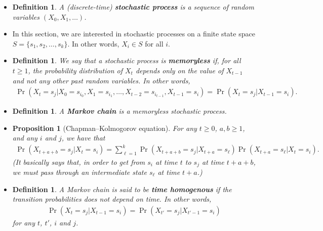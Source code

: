 \documentclass[10pt]{article}
\newtheorem{definition}[lemma]{Definition}
\newtheorem{proposition}[lemma]{Proposition}
\begin{document}
\begin{itemize}
  \item \begin{definition}
    A (discrete-time) {\bf stochastic process} is a sequence of random variables $(X_0, X_1, \dotsc)$.
  \end{definition}

  \item In this section, we are interested in stochastic processes on a finite state space $S = \{s_1, s_2, \dotsc, s_k\}$. In other words, $X_i \in S$ for all $i$.
  
  \item \begin{definition}
    We say that a stochastic process is {\bf memoryless} if, for all $t \geq 1$, the probability distribution of $X_t$ depends only on the value of $X_{t-1}$ and not any other past random variables. In other words,
    \begin{align*}
        \Pr(X_t = s_j | X_0 = s_{i_0}, X_1 = s_{i_1}, \dotsc, X_{t-2} = s_{i_{t-1}}, X_{t-1} = s_i)
        = \Pr(X_t = s_j | X_{t-1} = s_i).
    \end{align*}
  \end{definition}

  \item \begin{definition}
    A {\bf Markov chain} is a memoryless stochastic process.
  \end{definition}

  \item \begin{proposition}[Chapman--Kolmogorov equation]
    For any $t \geq 0$, $a,b \geq 1$, and any $i$ and $j$, we have that
    \begin{align*}
        \Pr(X_{t+a+b}=s_j|X_t=s_i)
        = \sum_{\ell=1}^k \Pr(X_{t+a+b}=s_j|X_{t+a}=s_\ell) \Pr(X_{t+a}=s_\ell|X_{t}=s_i).
    \end{align*}
    (It basically says that, in order to get from $s_i$ at time $t$ to $s_j$ at time $t+a+b$, we must pass through an intermediate state $s_\ell$ at time $t+a$.)
  \end{proposition}

  \item \begin{definition}
    A Markov chain is said to be {\bf time homogenous} if the transition probabilities does not depend on time. In other words,
    \begin{align*}
        \Pr(X_t = s_j | X_{t-1} = s_i) = \Pr(X_{t'} = s_j | X_{t'-1} = s_i)
    \end{align*}
    for any $t$, $t'$, $i$ and $j$.
  \end{definition}


\end{itemize}
\end{document}
